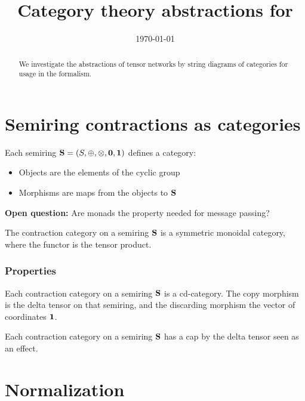 \documentclass[aps,onecolumn,nofootinbib,pra]{article}
\begin{document}
    \title{Category theory abstractions for \tnreason{}}

    \maketitle
    \date{\today}

    \begin{abstract}
        We investigate the abstractions of tensor networks by string diagrams of categories for usage in the \tnreason{} formalism.
    \end{abstract}


    \section{Semiring contractions as categories}

    Each semiring $\mathbf{S}=(S,\oplus,\otimes,\mathbf{0},\mathbf{1})$ defines a category:
    \begin{itemize}
        \item Objects are the elements of the cyclic group
        \item Morphisms are maps from the objects to $\mathbf{S}$
    \end{itemize}

    {\bf Open question:} Are monads the property needed for message passing?


    The contraction category on a semiring $\mathbf{S}$ is a symmetric monoidal category, where the functor is the tensor product.

    \subsubsection{Properties}

    \begin{lemma}
        Each contraction category on a semiring $\mathbf{S}$ is a cd-category.
        The copy morphism is the delta tensor on that semiring, and the discarding morphism the vector of coordinates $\mathbf{1}$.
    \end{lemma}

    \begin{lemma}
        Each contraction category on a semiring $\mathbf{S}$ has a cap by the delta tensor seen as an effect.
    \end{lemma}

    \section{Normalization}
\end{document}
